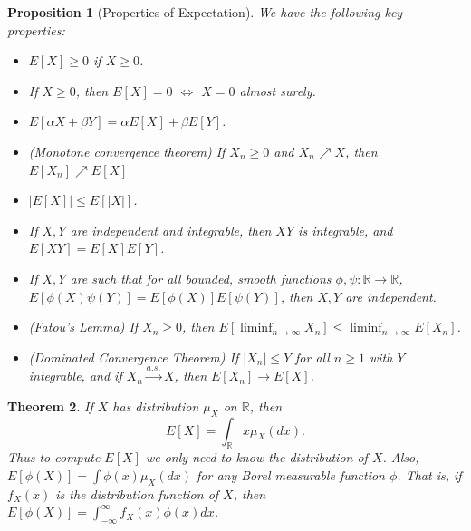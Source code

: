 \documentclass[12pt,reqno]{article}
\renewcommand{\emph}[1]{\textit{#1}}
\theoremstyle{plain}
\newtheorem{theorem}{Theorem}[section]
\newtheorem{prop}[theorem]{Proposition}
\theoremstyle{definition}
\begin{document}
\begin{prop}[Properties of Expectation]
We have the following key properties:
\begin{itemize} 

\item[(1)] $E[X] \geq 0$ if $X \geq 0$. 
\item[(2)] If $X \geq 0$, then $E[X] = 0$ $\iff$ $X = 0$ almost surely. 
\item[(3)] 
     $E[\alpha X+\beta Y] = \alpha E[X] + \beta E[Y]$. 
\item[(4)] (\emph{Monotone convergence theorem}) If $X_n \geq 0$ and $X_n \nearrow X$, then 
     $E[X_n] \nearrow E[X]$
\item[(5)] $|E[X]| \leq E[|X|]$. 
\item[(6)] If $X,Y$ are independent and integrable, then $XY$ is 
     integrable, and $E[XY] = E[X] E[Y]$. 
\item[(7)] If $X,Y$ are such that for all bounded, smooth functions 
     $\phi,\psi: \mathbb{R} \rightarrow \mathbb{R}$, 
     $E[\phi(X)\psi(Y)] = E[\phi(X)] E[\psi(Y)]$, then $X,Y$ are 
     independent. 
\item[(8)] (\emph{Fatou's Lemma}) If $X_n \geq 0$, then 
     $E\left[\liminf_{n \rightarrow \infty} X_n\right] \leq 
     \liminf_{n \rightarrow \infty} E[X_n]$. 
\item[(9)] (\emph{Dominated Convergence Theorem}) 
     If $|X_n| \leq Y$ for all $n \geq 1$ with $Y$ integrable, and if 
     $X_n \xrightarrow{a.s.} X$, then $E[X_n] \rightarrow E[X]$. 

\end{itemize} 
\end{prop} 

\begin{theorem}
If $X$ has distribution $\mu_X$ on $\mathbb{R}$, then 
\[
E[X] = \int_{\mathbb{R}} x \mu_X(dx). 
\]
Thus to compute $E[X]$ we only need to know the distribution of $X$. 
Also, $E[\phi(X)] = \int \phi(x) \mu_X(dx)$ for any Borel measurable 
function $\phi$. That is, if $f_X(x)$ is the distribution function of $X$, 
then $E[\phi(X)] = \int_{-\infty}^{\infty} f_X(x) \phi(x) dx$. 
\end{theorem} 
\end{document}
